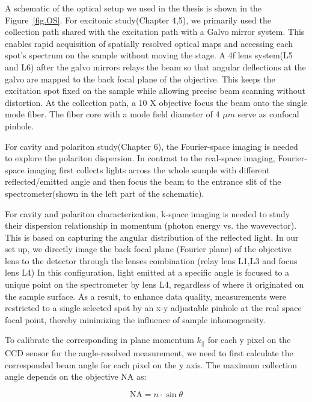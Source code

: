 A schematic of the optical setup we used in the thesis is shown in the Figure~\ref{fig.OS}. 
For excitonic study(Chapter 4,5), we primarily used the collection path shared with the excitation path with a Galvo mirror system. 
This enables rapid acquisition of spatially resolved optical maps and accessing each spot's spectrum on the sample without moving the stage.
A 4f lens system(L5 and L6) after the galvo mirrors relays the beam so that angular deflections at the galvo are mapped to the back focal plane of the objective. 
This keeps the excitation spot fixed on the sample while allowing precise beam scanning without distortion.
At the collection path, a 10 X objective focus the beam onto the single mode fiber. The fiber core with a mode field diameter of 4 $\mu m$ serve as confocal pinhole.

For cavity and polariton study(Chapter 6), the Fourier-space imaging is needed to explore the polariton dispersion. 
In contrast to the real-space imaging, Fourier-space imaging first collects lights across the whole sample with different reflected/emitted angle and then focus the beam to the entrance slit of the spectrometer(shown in the left part of the schematic).

For cavity and polariton characterization, k-space imaging is needed to study their dispersion relationship in momentum (photon energy vs. the wavevector). 
This is based on capturing the angular distribution of the reflected light.
In our set up, we directly image the back focal plane (Fourier plane) of the objective lens to the detector through the lenses combination (relay lens L1,L3 and focus lens L4)
In this configuration, light emitted at a specific angle is focused to a unique point on the spectrometer by lens L4, regardless of where it originated on the sample surface. 
As a result, to enhance data quality, measurements were restricted to a single selected spot by an x-y adjustable pinhole at the real space focal point, thereby minimizing the influence of sample inhomogeneity.

To calibrate the corresponding in plane momentum $k_{||}$ for each y pixel on the CCD sensor for the angle-resolved measurement, we need to first calculate the corresponded beam angle for each pixel on the y axis. 
The maximum collection angle depends on the objective NA as:

\begin{equation}
\text{NA} = n \cdot \sin\theta 
\label{eq:NA}
\end{equation}

